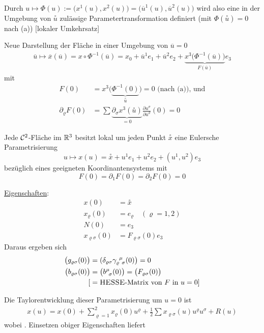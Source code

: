 Durch \(u \mapsto \Phi(u) := \big( x^1(u), x^2(u) \big) = \big(\overline u^1(u), \overline u^2(u)\big)\) wird also eine in der Umgebung von \(\stackrel \circ u\) zulässige Parametertransformation definiert (mit \(\Phi\left(\stackrel \circ u\right) = 0\) nach (a)) [lokaler Umkehrsatz] \par
Neue Darstellung der Fläche in einer Umgebung von \(\overline u = 0\)
\begin{align*}
 \overline u \mapsto \overline x(\overline u) = x \circ \Phi^{-1} (\overline u) = x_0 + \overline u^1 e_1 + \overline u^2 e_2 + \underbrace{x^3\big(\Phi^{-1}(\overline u)\big)}_{F(\overline u)} e_3
\end{align*}
mit 
\begin{align*} 
F(0) &= x^3\big(\underbrace{\Phi^{-1}(0)}_{\stackrel \circ u}\big)= 0 \text{ (nach (a)), und} \\
\partial_\varrho F(0) &= \sum \underbrace{\partial_\sigma x^3\left(\stackrel \circ u\right)}_{= 0} \frac{\partial u^\sigma}{\partial \overline u^\varrho}(0) =0
\end{align*}

\begin{hilfssatz}
 Jede \(\mathcal{C}^2\)-Fläche im \(\mathbb{R}^3\) besitzt lokal um jeden Punkt \(\stackrel \circ x\) eine Eulersche Parametrisierung 
 \[
  u \mapsto x(u) = \stackrel \circ x + u^1 e_1 + u^2 e_2 + (u^1, u^2) e_3
 \]
 bezüglich eines geeigneten Koordinantensystems mit
 \[
  F(0) = \partial_1 F(0) = \partial_2 F(0) = 0
 \]
\end{hilfssatz}

\uline{Eigenschaften}:
\begin{align*}
 x(0) &= \stackrel \circ x \\
 x_\varrho(0) &= e_\varrho \quad (\varrho = 1,2) \\
 N(0) &= e_3 \\
 x_{\varrho \sigma}(0) &= F_{\varrho \sigma} (0) e_3
\end{align*}
Daraus ergeben sich
\begin{align*}
 \big(g_{\varrho \sigma}(0)\big) &= (\delta_{\varrho \sigma}  \gamma_{\varrho \;\, \sigma}^{\;\, \mu} (0)\big) = 0\\
 \big(b_{\varrho \sigma}(0)\big) &= \big(b^{\mu}_{\;\, \sigma} (0) \big) = \big(F_{\varrho \sigma} (0) \big) \\ 
 [&= \text{\textsc{HESSE}-Matrix von } F \text{ in } u = 0]
\end{align*}

Die Taylorentwicklung dieser Parametrisierung um \(u = 0\) ist
\begin{align*}
 x(u) = x(0) + \sum_{\varrho = 1}^2 x_\varrho (0) u^\varrho + \frac12 \sum x_{\varrho \sigma}(u) u^\varrho u^\sigma + R(u)
\end{align*}
wobei . Einsetzen obiger Eigenschaften liefert 

